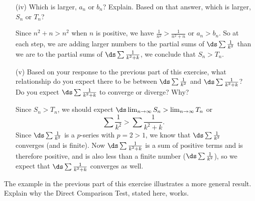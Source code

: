 \begin{exercises}
\begin{itemize}
        \item[(iv)] Which is larger, $a_n$ or $b_n$? Explain. Based on that answer, which is larger, $S_n$ or $T_n$?

\begin{exerciseSolution}
Since $n^2+n > n^2$ when $n$ is positive, we have $\frac{1}{n^2} > \frac{1}{n^2+n}$ or $a_n > b_n$. So at each step, we are adding larger numbers to the partial sums of $\ds \sum \frac{1}{k^2}$ than we are to the partial sums of $\ds \sum \frac{1}{k^2+k}$, we conclude that $S_n > T_n$.
\end{exerciseSolution}

        \item[(v)] Based on your response to the previous part of this exercise, what relationship do you expect there to be between $\ds \sum \frac{1}{k^2}$ and  $\ds \sum \frac{1}{k^2+k}$? Do you expect $\ds \sum \frac{1}{k^2+k}$ to converge or diverge? Why?

\begin{exerciseSolution}
Since $S_n > T_n$, we should expect $\ds \lim_{n \to \infty} S_n > \lim_{n \to \infty} T_n$ or
\[ \sum \frac{1}{k^2} >  \sum \frac{1}{k^2+k}.\]
Since $\ds \sum \frac{1}{k^2}$ is a $p$-series with $p=2 > 1$, we know that $\ds \sum \frac{1}{k^2}$ converges (and is finite). Now $\ds \sum \frac{1}{k^2+k}$ is a sum of positive terms and is therefore positive, and is also less than a finite number ($\ds \sum \frac{1}{k^2}$), so we expect that $\ds \sum \frac{1}{k^2+k}$ converges as well.
\end{exerciseSolution}

        \end{itemize}

    \item The example in the previous part of this exercise illustrates a more general result. Explain why the Direct Comparison Test, stated here, works.
    
\vspace*{5pt}
\nin {}
\vspace*{1pt}


\end{exercises}
